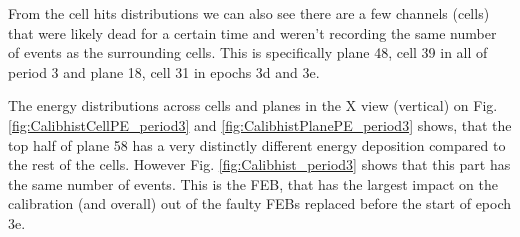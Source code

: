 From the cell hits distributions we can also see there are a few channels (cells) that were likely dead for a certain time and weren't recording the same number of events as the surrounding cells. This is specifically plane 48, cell 39 in all of period 3 and plane 18, cell 31 in epochs 3d and 3e.

The energy distributions across cells and planes in the X view (vertical) on Fig. \ref{fig:CalibhistCellPE_period3} and \ref{fig:CalibhistPlanePE_period3} shows, that the top half of plane 58 has a very distinctly different energy deposition compared to the rest of the cells. However Fig. \ref{fig:Calibhist_period3} shows that this part has the same number of events. This is the FEB, that has the largest impact on the calibration (and overall) out of the faulty FEBs replaced before the start of epoch 3e.

